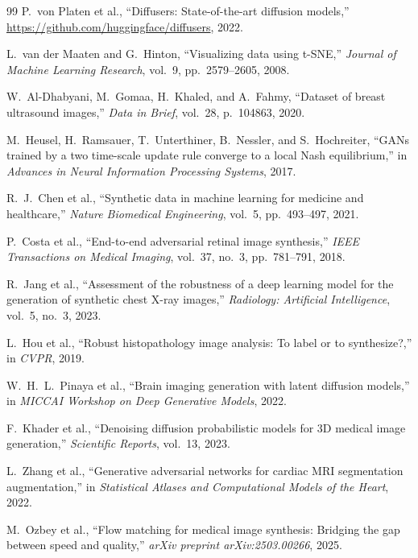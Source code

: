 \documentclass[twocolumn]{article}
\begin{document}
\begin{thebibliography}{99}
P.~von Platen et al., ``Diffusers: State-of-the-art diffusion models,'' \url{https://github.com/huggingface/diffusers}, 2022.

L.~van der Maaten and G.~Hinton, ``Visualizing data using t-SNE,'' \textit{Journal of Machine Learning Research}, vol.~9, pp.~2579--2605, 2008.

W.~Al-Dhabyani, M.~Gomaa, H.~Khaled, and A.~Fahmy, ``Dataset of breast ultrasound images,'' \textit{Data in Brief}, vol.~28, p.~104863, 2020.

M.~Heusel, H.~Ramsauer, T.~Unterthiner, B.~Nessler, and S.~Hochreiter, ``GANs trained by a two time-scale update rule converge to a local Nash equilibrium,'' in \textit{Advances in Neural Information Processing Systems}, 2017.

R.~J.~Chen et al., ``Synthetic data in machine learning for medicine and healthcare,'' \textit{Nature Biomedical Engineering}, vol.~5, pp.~493--497, 2021.

P.~Costa et al., ``End-to-end adversarial retinal image synthesis,'' \textit{IEEE Transactions on Medical Imaging}, vol.~37, no.~3, pp.~781--791, 2018.

R.~Jang et al., ``Assessment of the robustness of a deep learning model for the generation of synthetic chest X-ray images,'' \textit{Radiology: Artificial Intelligence}, vol.~5, no.~3, 2023.

L.~Hou et al., ``Robust histopathology image analysis: To label or to synthesize?,'' in \textit{CVPR}, 2019.

W.~H.~L.~Pinaya et al., ``Brain imaging generation with latent diffusion models,'' in \textit{MICCAI Workshop on Deep Generative Models}, 2022.

F.~Khader et al., ``Denoising diffusion probabilistic models for 3D medical image generation,'' \textit{Scientific Reports}, vol.~13, 2023.

L.~Zhang et al., ``Generative adversarial networks for cardiac MRI segmentation augmentation,'' in \textit{Statistical Atlases and Computational Models of the Heart}, 2022.

M.~Ozbey et al., ``Flow matching for medical image synthesis: Bridging the gap between speed and quality,'' \textit{arXiv preprint arXiv:2503.00266}, 2025.

\end{thebibliography}
\end{document}
